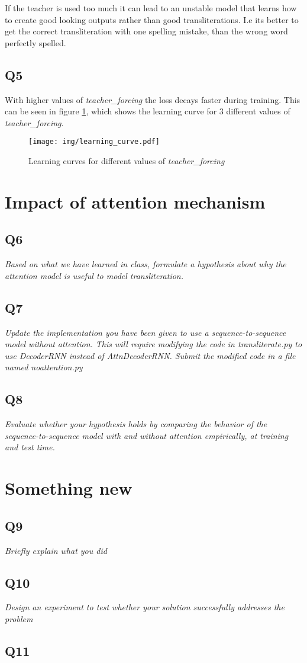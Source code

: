 \documentclass[12pt]{article}
\begin{document}
If the teacher is used too much it can lead to an unstable model that learns how to create good looking outputs rather than good transliterations. I.e its better to get the correct transliteration with one spelling mistake, than the wrong word perfectly spelled.

\subsection{Q5}
 
With higher values of \textit{teacher\_forcing} the loss decays faster during training. This can be seen in figure \ref{fig_teacher}, which shows the learning curve for 3 different values of \textit{teacher\_forcing}.

\begin{figure}[h]
    \centering
    \texttt{[image: img/learning\_curve.pdf]}
    \caption{Learning curves for different values of \textit{teacher\_forcing}}
    \label{fig_teacher}
\end{figure}

\section{Impact of attention mechanism}

\subsection{Q6}
\textit{
Based on what we have learned in class, formulate a hypothesis about why the attention model is useful to model transliteration.	
}

\subsection{Q7}
\textit{
Update the implementation you have been given to use a sequence-to-sequence model without attention.  This will require modifying the code in transliterate.py to use DecoderRNN instead of AttnDecoderRNN.  Submit the modified code in a file named noattention.py
}

\subsection{Q8}
\textit{
Evaluate whether your hypothesis holds by comparing the behavior of the sequence-to-sequence model with and without attention empirically, at training and test time.
}

\section{Something new}

\subsection{Q9}
\textit{Briefly explain what you did}

\subsection{Q10}
\textit{Design an experiment to test whether your solution successfully addresses the problem}

\subsection{Q11}
\textit{}
\end{document}
